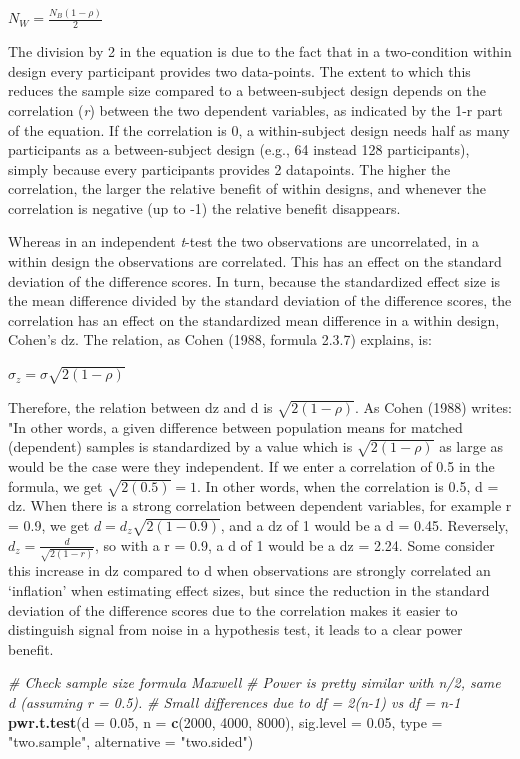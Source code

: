 \documentclass[]{book}
\newenvironment{Shaded}{\begin{snugshade}}{\end{snugshade}}
\newcommand{\CommentTok}[1]{\textcolor[rgb]{0.56,0.35,0.01}{\textit{#1}}}
\newcommand{\DataTypeTok}[1]{\textcolor[rgb]{0.13,0.29,0.53}{#1}}
\newcommand{\DecValTok}[1]{\textcolor[rgb]{0.00,0.00,0.81}{#1}}
\newcommand{\FloatTok}[1]{\textcolor[rgb]{0.00,0.00,0.81}{#1}}
\newcommand{\KeywordTok}[1]{\textcolor[rgb]{0.13,0.29,0.53}{\textbf{#1}}}
\newcommand{\NormalTok}[1]{#1}
\newcommand{\StringTok}[1]{\textcolor[rgb]{0.31,0.60,0.02}{#1}}
\begin{document}
\(N_{W}=\frac{N_{B}(1-\rho)}{2}\)

The division by 2 in the equation is due to the fact that in a two-condition within design every participant provides two data-points. The extent to which this reduces the sample size compared to a between-subject design depends on the correlation (\emph{r}) between the two dependent variables, as indicated by the 1-r part of the equation. If the correlation is 0, a within-subject design needs half as many participants as a between-subject design (e.g., 64 instead 128 participants), simply because every participants provides 2 datapoints. The higher the correlation, the larger the relative benefit of within designs, and whenever the correlation is negative (up to -1) the relative benefit disappears.

Whereas in an independent \emph{t}-test the two observations are uncorrelated, in a within design the observations are correlated. This has an effect on the standard deviation of the difference scores. In turn, because the standardized effect size is the mean difference divided by the standard deviation of the difference scores, the correlation has an effect on the standardized mean difference in a within design, Cohen's dz. The relation, as Cohen (1988, formula 2.3.7) explains, is:

\(\sigma_{z}=\sigma\sqrt{2(1-\rho)}\)

Therefore, the relation between dz and d is \(\sqrt{2(1-\rho)}\). As Cohen (1988) writes: "In other words, a given difference between population means for matched (dependent) samples is standardized by a value which is \(\sqrt{2(1-\rho)}\) as large as would be the case were they independent. If we enter a correlation of 0.5 in the formula, we get \(\sqrt{2(0.5)}=1\). In other words, when the correlation is 0.5, d = dz. When there is a strong correlation between dependent variables, for example r = 0.9, we get \(d=d_{z}\sqrt{2(1-0.9)}\), and a dz of 1 would be a d = 0.45. Reversely, \(d_{z}=\frac{d}{\sqrt{2(1-r)}}\), so with a r = 0.9, a d of 1 would be a dz = 2.24. Some consider this increase in dz compared to d when observations are strongly correlated an `inflation' when estimating effect sizes, but since the reduction in the standard deviation of the difference scores due to the correlation makes it easier to distinguish signal from noise in a hypothesis test, it leads to a clear power benefit.

\begin{Shaded}
\begin{Highlighting}[]
\CommentTok{# Check sample size formula Maxwell}
\CommentTok{# Power is pretty similar with n/2, same d (assuming r = 0.5). }
\CommentTok{# Small differences due to df = 2(n-1) vs df = n-1}
\KeywordTok{pwr.t.test}\NormalTok{(}\DataTypeTok{d =} \FloatTok{0.05}\NormalTok{,}
           \DataTypeTok{n =} \KeywordTok{c}\NormalTok{(}\DecValTok{2000}\NormalTok{, }\DecValTok{4000}\NormalTok{, }\DecValTok{8000}\NormalTok{),}
           \DataTypeTok{sig.level =} \FloatTok{0.05}\NormalTok{,}
           \DataTypeTok{type =} \StringTok{"two.sample"}\NormalTok{,}
           \DataTypeTok{alternative =} \StringTok{"two.sided"}\NormalTok{)}
\end{Highlighting}
\end{Shaded}
\end{document}
